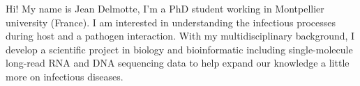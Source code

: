 

\begin{cvparagraph}

Hi! My name is Jean Delmotte, I'm a PhD student working in Montpellier university (France). I am interested in understanding the infectious processes during host and a pathogen interaction. With my multidisciplinary background, I develop a scientific project in biology and bioinformatic including single-molecule long-read RNA and DNA sequencing data to help expand our knowledge a little more on infectious diseases.
\end{cvparagraph}
